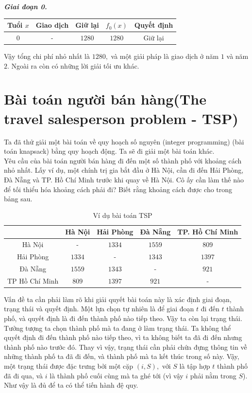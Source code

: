 \documentclass[12pt,a4paper]{article}
\begin{document}
\textbf{\textit{Giai đoạn 0.}}
\begin{center}
\begin{table}[H]
\begin{tabular}{|c|c|c|c|c|}
\hline 
Tuổi \(x\) & Giao dịch & Giữ lại & \(f_0 \left( x \right)\) & Quyết định \\ 
\hline 
\(0\) & - & \(1280\) & \(1280\) & Giữ lại \\ 
\hline 
\end{tabular} 
\end{table}
\end{center}
Vậy tổng chi phí nhỏ nhất là \(1280,\) và một giải pháp là giao dịch ở năm \(1\) và năm \(2.\) Ngoài ra còn có những lời giải tối ưu khác.
\section{Bài toán người bán hàng(The travel salesperson problem - TSP)}
Ta đã thử giải một bài toán về quy hoạch số nguyên (integer programming) (bài toán knapsack) bằng quy hoạch động. Ta sẽ đi giải một bài toán khác.\\
Yêu cầu của bài toán người bán hàng đi đến một số thành phố với khoảng cách nhỏ nhất. Lấy ví dụ, một chính trị gia bắt đầu ở Hà Nội, cần đi đến Hải Phòng, Đà Nẵng và TP. Hồ Chí Minh trước khi quay về Hà Nội. Cô ấy cần làm thế nào để tối thiểu hóa khoảng cách phải đi? Biết rằng khoảng cách được cho trong bảng sau.
\begin{center}
\begin{table}[H]
\label{bang5}
\begin{tabular}{|c|c|c|c|c|}
\hline 
  & Hà Nội & Hải Phòng & Đà Nẵng & TP. Hồ Chí Minh \\ 
\hline 
Hà Nội & - & \(1334\) & \(1559\) & \(809\) \\ 
\hline 
Hải Phòng & \(1334\) & - & \(1343\) & \(1397\) \\ 
\hline 
Đà Nẵng & \(1559\) & \(1343\) & - & \(921\) \\ 
\hline 
TP Hồ Chí Minh & \(809\) & \(1397\) & \(921\) & - \\ 
\hline 
\end{tabular} 
\caption{Ví dụ bài toán TSP}
\end{table}
\end{center}
Vấn đề ta cần phải làm rõ khi giải quyết bài toán này là xác định giai đoạn, trạng thái và quyết định. Một lựa chọn tự nhiên là để giai đoạn \(t\) đi đến \(t\) thành phố, và quyết định là đi đến thành phố nào tiếp theo. Vậy ta còn lại trạng thái. Tưởng tượng ta chọn thành phố mà ta đang ở làm trạng thái. Ta không thể quyết định đi đến thành phố nào tiếp theo, vì ta không biết ta đã đi đến nhưng thành phố nào trước đó. Thay vì vậy, trạng thái cần phải chứa đựng thông tin về những thành phố ta đã đi đến, và thành phố mà ta kết thúc trong số này. Vậy, một trạng thái được đặc trưng bởi một cặp \(\left( {i, S} \right),\) với \(S\) là tập hợp \(t\) thành phố đã đi qua, và \(i\) là thành phố cuối cùng mà ta ghé tới (vì vậy \(i\) phải nằm trong \(S\)). Như vậy là đủ để ta có thể tiến hành đệ quy.\\
\end{document}
